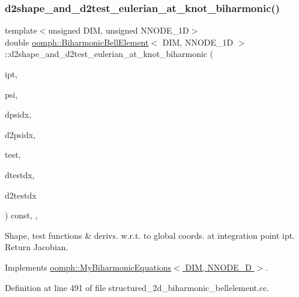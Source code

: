 \subsubsection{\texorpdfstring{d2shape\+\_\+and\+\_\+d2test\+\_\+eulerian\+\_\+at\+\_\+knot\+\_\+biharmonic()}{d2shape\_and\_d2test\_eulerian\_at\_knot\_biharmonic()}}
{\footnotesize\ttfamily template$<$unsigned D\+IM, unsigned N\+N\+O\+D\+E\+\_\+1D$>$ \\
double \hyperlink{classoomph_1_1BiharmonicBellElement}{oomph\+::\+Biharmonic\+Bell\+Element}$<$ D\+IM, N\+N\+O\+D\+E\+\_\+1D $>$\+::d2shape\+\_\+and\+\_\+d2test\+\_\+eulerian\+\_\+at\+\_\+knot\+\_\+biharmonic (\begin{DoxyParamCaption}\item[{const unsigned \&}]{ipt,  }\item[{Shape \&}]{psi,  }\item[{D\+Shape \&}]{dpsidx,  }\item[{D\+Shape \&}]{d2psidx,  }\item[{Shape \&}]{test,  }\item[{D\+Shape \&}]{dtestdx,  }\item[{D\+Shape \&}]{d2testdx }\end{DoxyParamCaption}) const\hspace{0.3cm}{\ttfamily [inline]}, {\ttfamily [protected]}, {\ttfamily [virtual]}}



Shape, test functions \& derivs. w.\+r.\+t. to global coords. at integration point ipt. Return Jacobian. 



Implements \hyperlink{classoomph_1_1MyBiharmonicEquations_a85687f39c0fb72f25ce67f5867a83470}{oomph\+::\+My\+Biharmonic\+Equations$<$ D\+I\+M, N\+N\+O\+D\+E\+\_\+D $>$}.



Definition at line 491 of file structured\+\_\+2d\+\_\+biharmonic\+\_\+bellelement.\+cc.

\mbox{\label{classoomph_1_1BiharmonicBellElement_ac0343916d2900e138d5d5e98aa46b758}} 
